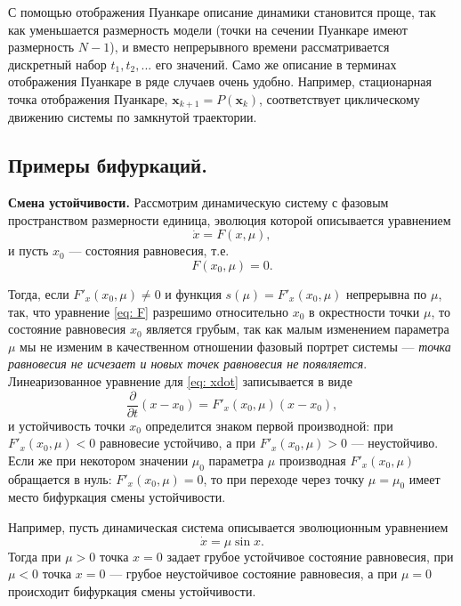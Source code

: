 С помощью отображения Пуанкаре описание динамики становится проще, так как уменьшается размерность модели (точки на сечении Пуанкаре имеют размерность $N-1$), и вместо непрерывного времени рассматривается дискретный набор $t_{1}, t_{2}, ...$ его значений. Само же описание в терминах отображения Пуанкаре в ряде случаев очень удобно. Например, стационарная точка отображения Пуанкаре, $\textbf{x}_{k+1} = P(\textbf{x}_{k})$, соответствует циклическому движению системы по замкнутой траектории.
\subsection{Примеры бифуркаций.} \textbf{Смена устойчивости.}
Рассмотрим динамическую систему с фазовым пространством размерности единица, эволюция которой описывается уравнением
\begin{equation}\label{eq: xdot}
    \dot{x} = F(x, \mu),
\end{equation}
и пусть $x_{0}$ --- состояния равновесия, т.е.
\begin{equation}\label{eq: F}
    F(x_{0}, \mu) = 0.
\end{equation}

Тогда, если $F'_{x}(x_{0}, \mu) \not = 0$ и функция $s(\mu) = F'_{x}(x_{0}, \mu)$ непрерывна по $\mu$, так, что уравнение \eqref{eq: F} разрешимо относительно $x_{0}$ в окрестности точки $\mu$, то состояние равновесия $x_{0}$ является грубым, так как малым изменением параметра $\mu$ мы не изменим в качественном отношении фазовый портрет системы --- \textit{точка равновесия не исчезает и новых точек равновесия не появляется}. Линеаризованное уравнение для \eqref{eq: xdot} записывается в виде
\begin{equation*}
    \dfrac{\partial}{\partial t}(x-x_{0}) = F'_{x}(x_{0}, \mu)(x-x_{0}),
\end{equation*}
и устойчивость точки $x_{0}$ определится знаком первой производной: при $F'_{x}(x_{0}, \mu) < 0$ равновесие устойчиво, а при $F'_{x}(x_{0}, \mu) > 0$ --- неустойчиво. Если же при некотором значении $\mu_{0}$ параметра $\mu$ производная $F'_{x}(x_{0}, \mu)$ обращается в нуль: $F'_{x}(x_{0}, \mu) = 0$, то при переходе через точку $\mu = \mu_{0}$ имеет место бифуркация смены устойчивости.

Например, пусть динамическая система описывается эволюционным уравнением
\begin{equation*}
    \dot{x} = \mu \sin{x}.
\end{equation*}
Тогда при $\mu > 0$ точка $x = 0$ задает грубое устойчивое состояние равновесия, при $\mu < 0$ точка $x = 0$ --- грубое неустойчивое состояние равновесия, а при $\mu = 0$ происходит бифуркация смены устойчивости.

